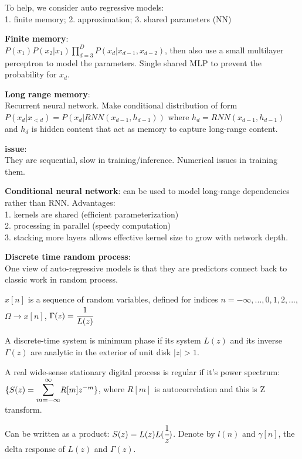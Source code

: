 \documentclass[12pt,a4paper]{article}
\begin{document}
To help, we consider auto regressive models:\\
1. finite memory; 2. approximation; 3. shared parameters (NN)

\textbf{Finite memory}: \\
$P(x_1)P(x_2|x_1)\prod_{d=3}^D P(x_d|x_{d-1},x_{d-2})$, then also use a small multilayer perceptron to model the parameters. Single shared MLP to prevent the probability for $x_d$. 


\textbf{Long range memory}: \\
Recurrent neural network. Make conditional distribution of form $P(x_d|x_{<d})=P(x_d|RNN(x_{d-1},h_{d-1}))$ where $h_d=RNN(x_{d-1},h_{d-1})$ and $h_d$ is hidden content that act as memory to capture long-range content. 


\textbf{issue}: \\
They are sequential, slow in training/inference. Numerical issues in training them. 

\textbf{Conditional neural network}: can be used to model long-range dependencies rather than RNN. Advantages:\\
1. kernels are shared (efficient parameterization)\\
2. processing in parallel (speedy computation) \\
3. stacking more layers allows effective kernel size to grow with network depth. 

\vspace{0.5cm}
\textbf{Discrete time random process}:\\
One view of auto-regressive models is that they are predictors connect back to classic work in random process. 

$x[n]$ is a sequence of random variables, defined for indices $n=-\infty,...,0,1,2,...$, \\
$\Omega\rightarrow x[n]$, $\Gamma(z)=\cfrac{1}{L(z)}$

A discrete-time system is minimum phase if its system $L(z)$ and its inverse $\Gamma(z)$ are analytic in the exterior of unit disk $|z|>1$. 

A real wide-sense stationary digital process is regular if it's power spectrum:\\
$\{S(z)=\bsum{m=-\infty}{\infty} R[m]z^{-m}\}$, where $R[m]$ is autocorrelation and this is Z transform. 

Can be written as a product: $S(z)=L(z)L(\cfrac{1}{z})$. 
Denote by $l(n)$ and $\gamma[n]$, the delta response of $L(z)$ and $\Gamma(z)$. 
\end{document}
